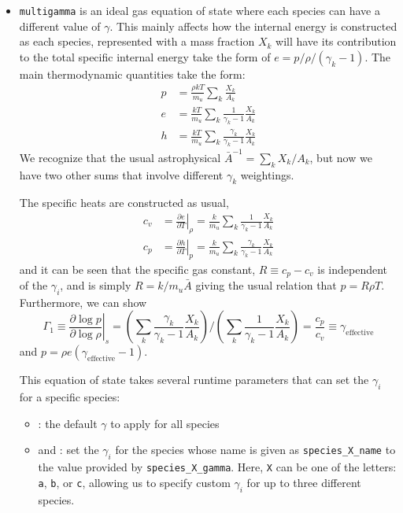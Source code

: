 \begin{itemize}
\item {\tt multigamma} is an ideal gas equation of state where each
  species can have a different value of $\gamma$.  This mainly affects
  how the internal energy is constructed as each species, represented
  with a mass fraction $X_k$ will have its contribution to the total
  specific internal energy take the form of $e = p/\rho/(\gamma_k -                                               
  1)$.  The main thermodynamic quantities take the form:
\begin{align}
p &= \frac{\rho k T}{m_u} \sum_k \frac{X_k}{A_k} \\
e &= \frac{k T}{m_u} \sum_k \frac{1}{\gamma_k - 1} \frac{X_k}{A_k} \\
h &= \frac{k T}{m_u} \sum_k \frac{\gamma_k}{\gamma_k - 1} \frac{X_k}{A_k}
\end{align}
We recognize that the usual astrophysical $\bar{A}^{-1} = \sum_k                                                  
X_k/A_k$, but now we have two other sums that involve different
$\gamma_k$ weightings.

The specific heats are constructed as usual,
\begin{align}
c_v &= \left . \frac{\partial e}{\partial T} \right |_\rho =
    \frac{k}{m_u} \sum_k \frac{1}{\gamma_k - 1} \frac{X_k}{A_k} \\
c_p &= \left . \frac{\partial h}{\partial T} \right |_p =
    \frac{k}{m_u} \sum_k \frac{\gamma_k}{\gamma_k - 1} \frac{X_k}{A_k}
\end{align}
and it can be seen that the specific gas constant, $R \equiv c_p - c_v$ is
independent of the $\gamma_i$, and is simply $R = k/m_u\bar{A}$ giving the
usual relation that $p = R\rho T$.  Furthermore, we can show
\begin{equation}
\Gamma_1 \equiv \left . \frac{\partial \log p}{\partial \log \rho} \right |_s =
   \left ( \sum_k \frac{\gamma_k}{\gamma_k - 1} \frac{X_k}{A_k} \right ) \bigg /
   \left ( \sum_k \frac{1}{\gamma_k - 1} \frac{X_k}{A_k} \right ) =
\frac{c_p}{c_v} \equiv \gamma_\mathrm{effective}
\end{equation}
and $p = \rho e (\gamma_\mathrm{effective} - 1)$.

This equation of state takes several runtime parameters that can set the
$\gamma_i$ for a specific species:
\begin{itemize}
\item {}: the default $\gamma$ to apply for
  all species
\item {} and : set the $\gamma_i$
  for the species whose name is given as {\tt species\_X\_name} to the
  value provided by {\tt species\_X\_gamma}.  Here, {\tt X} can be one
  of the letters: {\tt a}, {\tt b}, or {\tt c}, allowing us to specify
  custom $\gamma_i$ for up to three different species.
\end{itemize}

\end{itemize}

